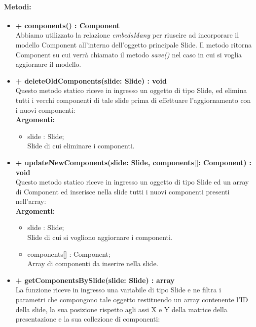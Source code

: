 	\paragraph{Metodi:}
	\begin{itemize}
		\item \textbf{+ components() : Component}\\
		Abbiamo utilizzato la relazione \textit{embedsMany} per riuscire ad incorporare il modello Component all'interno dell'oggetto principale \gls{Slide}. Il metodo ritorna Component su cui verrà chiamato il metodo \textit{save()} nel caso in cui si voglia aggiornare il modello.
		\item \textbf{+ deleteOldComponents(slide: Slide) : void}\\
		Questo metodo statico riceve in ingresso un oggetto di tipo \gls{Slide}, ed elimina tutti i vecchi componenti di tale \gls{slide} prima di effettuare l'aggiornamento con i nuovi componenti:\\
		\textbf{Argomenti:}
		\begin{itemize}
			\item \gls{slide} : \gls{Slide};\\
			\gls{Slide} di cui eliminare i componenti.
		\end{itemize}
		\newpage
		\item \textbf{+ updateNewComponents(slide: Slide, components[]: Component) : void}\\
		Questo metodo statico riceve in ingresso un oggetto di tipo \gls{Slide} ed un array di Component ed inserisce nella \gls{slide} tutti i nuovi componenti presenti nell'array:\\
		\textbf{Argomenti:}
		\begin{itemize}
			\item slide : Slide;\\
			\gls{Slide} di cui si vogliono aggiornare i componenti.
			\item components[] : Component;\\
			Array di componenti da inserire nella \gls{slide}.
		\end{itemize}
		\item \textbf{+ getComponentsBySlide(slide: Slide) : array}\\
		La funzione riceve in ingresso una variabile di tipo Slide e ne filtra i parametri che compongono tale oggetto restituendo un array contenente l'ID della \gls{slide}, la sua posizione rispetto agli assi X e Y della matrice della presentazione e la sua collezione di componenti:\\

\end{itemize}
